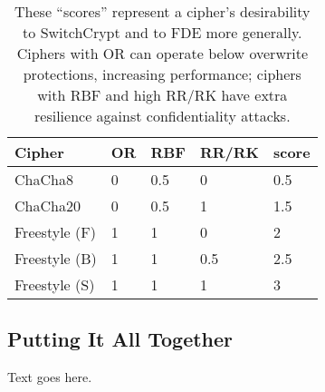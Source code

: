 \begin{table}[]
  \begin{tabular}{@{}lllll@{}}
  \toprule
  \textbf{Cipher} & \textbf{OR} & \textbf{RBF} & \textbf{RR/RK} & \textbf{score} \\ \midrule
  ChaCha8         & 0           & 0.5          & 0              & 0.5            \\
  ChaCha20        & 0           & 0.5          & 1              & 1.5            \\
  Freestyle (F)   & 1           & 1            & 0              & 2              \\
  Freestyle (B)   & 1           & 1            & 0.5            & 2.5            \\
  Freestyle (S)   & 1           & 1            & 1              & 3
  \end{tabular}
  \caption{These ``scores'' represent a cipher's desirability to SwitchCrypt and
  to FDE more generally. Ciphers with OR can operate below overwrite
  protections, increasing performance; ciphers with RBF and high RR/RK have
  extra resilience against confidentiality attacks.}
  \label{tbl:security-quant}
\end{table}

\subsection{Putting It All Together} \label{subsec:summary}

Text goes here.


